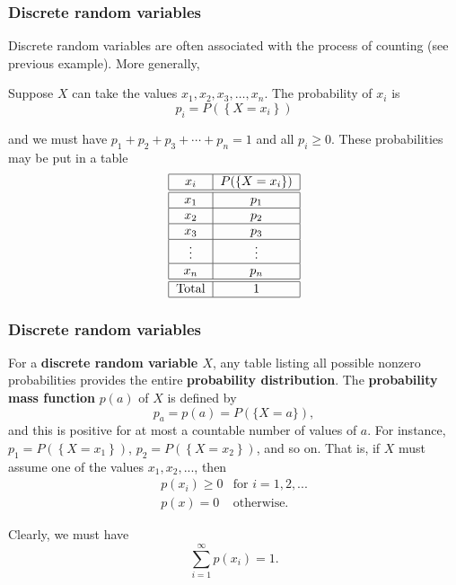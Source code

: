 \documentclass[notes=show,smaller]{beamer}\usepackage[]{graphicx}\usepackage[]{color}
\newcommand{\bea}{\begin{eqnarray}}
\newcommand{\eea}{\end{eqnarray}}
\newcommand{\nn}{\nonumber}
\begin{document}
\begin{frame}{\secname}%

\frametitle{Discrete random variables}

Discrete random variables are often associated with the process of counting (see previous
example). More generally,
\begin{definition}
Suppose $X$ can take the values $x_{1},x_{2},x_{3},\ldots ,x_{n}$. The probability of $x_{i}$ is
$$p_{i}= P(\left\{ X=x_i\right\})$$

and we must have $p_{1}+p_{2}+p_{3}+\cdots +p_{n}=1$ and all $p_{i}\geq 0$. These probabilities may be put in a table%
\begin{equation*}
\begin{tabular}{|c|c|}
\hline
$x_i $ & $P(\left\{ X=x_i\right\}) $ \\ \hline\hline
$x_{1}$ & $p_{1}$ \\ \hline
$x_{2}$ & $p_{2}$ \\ \hline
$x_{3}$ & $p_{3}$ \\ \hline
$\vdots $ & $\vdots $ \\ \hline
$x_{n}$ & $p_{n}$ \\ \hline\hline
Total & $1$ \\ \hline
\end{tabular}%
\end{equation*}
\end{definition}
\end{frame}%

\begin{frame}{\secname}%

\frametitle{Discrete random variables}


For a \textbf{discrete random variable $X$}, any table listing all
possible nonzero probabilities provides the entire \textbf{probability
distribution}. The \textbf{probability mass function} $p(a)$ of $X$ is defined by
$$ p_a = p(a)= P(\{X=a \}),
$$
and this is positive for at most a countable number of values of $a$. For instance,
$p_{1} = P(\left\{ X=x_1\right\})$, $p_{2} = P(\left\{ X=x_2\right\})$, and so on.
That is, if $X$ must assume
one of the values $x_1,x_2,...$, then
\bea
 p(x_i) \geq 0 & \text{for \ \ } i=1,2,... \nn \\
 p(x) = 0 & \text{otherwise.}
\eea

Clearly, we must have
$$
\sum_{i=1}^{\infty} p(x_i) = 1.
$$



\end{frame}%
\end{document}
